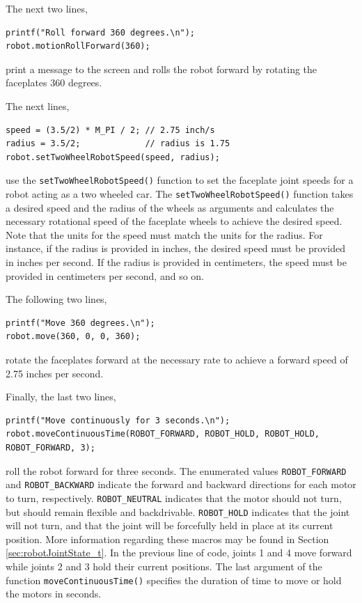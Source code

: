 \documentclass{article}
\begin{document}
The next two lines,
\begin{verbatim}
printf("Roll forward 360 degrees.\n");
robot.motionRollForward(360);
\end{verbatim}
print a message to the screen and rolls the robot forward by rotating the faceplates
360 degrees.

The next lines,
\begin{verbatim}
speed = (3.5/2) * M_PI / 2; // 2.75 inch/s 
radius = 3.5/2;             // radius is 1.75 
robot.setTwoWheelRobotSpeed(speed, radius);
\end{verbatim}
use the \texttt{setTwoWheelRobotSpeed()} function to set the faceplate joint
speeds for a robot acting as a two wheeled car. The
\texttt{setTwoWheelRobotSpeed()} function takes a desired speed
and the radius of the wheels as arguments and calculates the necessary
rotational speed of the faceplate wheels to achieve the desired speed. Note
that the units for the speed must match the units for the radius. For instance,
if the radius is provided in inches, the desired speed must be provided in 
inches per second. If the radius is provided in centimeters, the speed must
be provided in centimeters per second, and so on.

The following two lines,
\begin{verbatim}
printf("Move 360 degrees.\n");
robot.move(360, 0, 0, 360);
\end{verbatim}
rotate the faceplates forward at the necessary rate to achieve a forward speed of
2.75 inches per second.

Finally, the last two lines,
\begin{verbatim}
printf("Move continuously for 3 seconds.\n");
robot.moveContinuousTime(ROBOT_FORWARD, ROBOT_HOLD, ROBOT_HOLD, ROBOT_FORWARD, 3);
\end{verbatim}
roll the robot forward for three seconds.
The enumerated values \texttt{ROBOT\_FORWARD} and \texttt{ROBOT\_BACKWARD}
indicate the forward and backward directions for each motor to turn, respectively. 
\texttt{ROBOT\_NEUTRAL} indicates that the motor should not turn, but
should remain flexible and backdrivable. \texttt{ROBOT\_HOLD}
indicates that the joint will not turn, and that the joint will be 
forcefully held in place at its current position. More information regarding these
macros may be found in Section \ref{sec:robotJointState_t}. In the previous
line of code, joints 1 and 4 
move forward while joints 2 and 3 hold their current positions. The
last argument  of the function \texttt{moveContinuousTime()} specifies the
duration of time to move or hold the motors in seconds.
\end{document}
